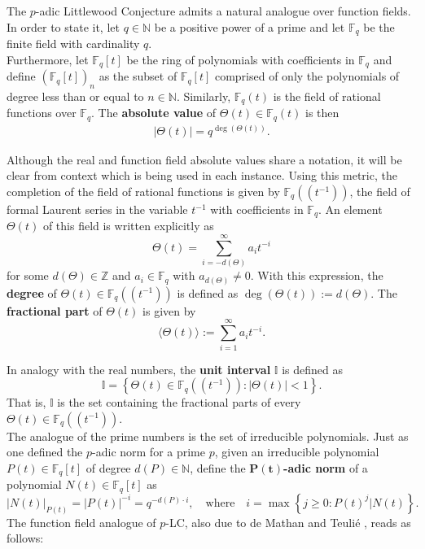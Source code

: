 \documentclass{article}
\theoremstyle{definition}
\newcommand{\N}{\mathbb{N}}
\newcommand{\F}{\mathbb{F}}
\newcommand{\I}{\mathbb{I}}
\numberwithin{equation}{subsection}
\begin{document}
 \noindent The $p$-adic Littlewood Conjecture admits a natural analogue over function fields. In order to state it, let $q\in\N$ be a positive power of a prime and let $\mathbb{F}_q$ be the finite field with cardinality $q$. \\
 
 \noindent Furthermore, let $\F_q[t]$ be the ring of polynomials with coefficients in $\F_q$ and define $(\F_q[t])_n$ as the subset of $\F_q[t]$ comprised of only the polynomials of degree less than or equal to $n\in\N$. Similarly, ${\F_q}(t)$ is the field of rational functions over ${\F_q}$. The \textbf{absolute value} of $\Theta(t)\in{\F_q}(t)$ is then \begin{align}|\Theta(t)|=q^{\deg(\Theta(t))}.\label{absv}\end{align} 
    
\noindent Although the real and function field absolute values share a notation, it will be clear from context which is being used in each instance. Using this metric, the completion of the field of rational functions is given by ${\F_q}\!\left(\!\left(t^{-1}\right)\!\right)$, the field of formal Laurent series in the variable $t^{-1}$ with coefficients in ${\F_q}$. An element $\Theta(t)$ of this field is written explicitly as \begin{equation}\label{laurent}\Theta(t)=\sum^\infty_{i=-d(\Theta)}a_it^{-i}\end{equation} for some $d(\Theta)\in\mathbb{Z}$ and $a_i\in{\F_q}$ with $a_{d(\Theta)}\neq0$. With this expression, the \textbf{degree} of $\Theta(t)\in{\F_q}\left(\!\left(t^{-1}\right)\!\right)$ is defined as $\deg(\Theta(t)):= d(\Theta)$. The \textbf{fractional part} of $\Theta(t)$ is given by $$\langle \Theta(t) \rangle := \sum^\infty_{i=1}a_it^{-i}.$$
 
 \noindent In analogy with the real numbers, the \textbf{unit interval} $\I$ is defined as \begin{equation}\label{Unit_interval}\I=\left\{\Theta(t)\in{\F_q}\left(\!\left(t^{-1}\right)\!\right): |\Theta(t)|<1\right\}.\end{equation} That is, $\I$ is the set containing the fractional parts of every $\Theta(t)\in{\F_q}\left(\!\left(t^{-1}\right)\!\right)$. \\

 \noindent The analogue of the prime numbers is the set of irreducible polynomials. Just as one defined the $p$-adic norm for a prime $p$, given an irreducible polynomial $P(t)\in{\F_q}[t]$ of degree $d(P)\in\N$, define the $\mathbf{P(t)}$\textbf{-adic norm} of a polynomial $N(t)\in{\F_q}[t]$ as 
 \[|N(t)|_{P(t)}=|P(t)|^{-i}=q^{-d(P)\cdot i},~~~\text{          where          }~~~ i=\max\left\{j\ge0: P(t)^j|N(t)\right\}.\]
\noindent The function field analogue of $p$-LC, also due to de Mathan and Teulié \cite{padic}, reads as follows: 
\end{document}
